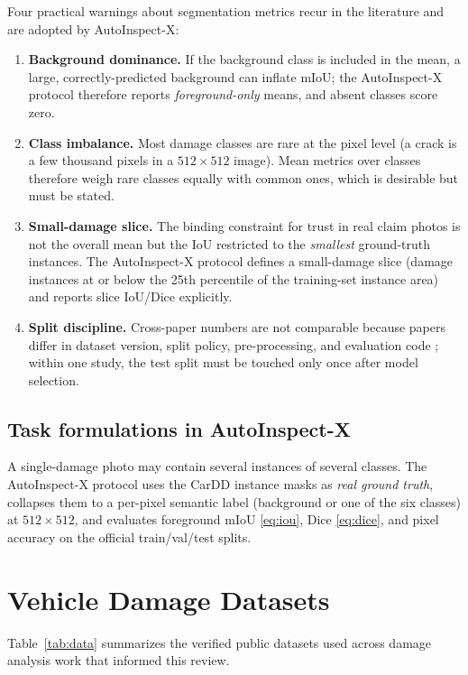 \documentclass[conference]{IEEEtran}
\begin{document}
Four practical warnings about segmentation metrics recur in the literature
\cite{voc2010,hasan2025} and are adopted by AutoInspect-X:
\begin{enumerate}
  \item \textbf{Background dominance.} If the background class is included in
  the mean, a large, correctly-predicted background can inflate mIoU; the
  AutoInspect-X protocol therefore reports \emph{foreground-only} means, and
  absent classes score zero.
  \item \textbf{Class imbalance.} Most damage classes are rare at the pixel
  level (a crack is a few thousand pixels in a $512\times512$ image). Mean
  metrics over classes therefore weigh rare classes equally with common ones,
  which is desirable but must be stated.
  \item \textbf{Small-damage slice.} The binding constraint for trust in real
  claim photos is not the overall mean but the IoU restricted to the
  \emph{smallest} ground-truth instances. The AutoInspect-X protocol defines a
  small-damage slice (damage instances at or below the 25th percentile of the
  training-set instance area) and reports slice IoU/Dice explicitly.
  \item \textbf{Split discipline.} Cross-paper numbers are not comparable because
  papers differ in dataset version, split policy, pre-processing, and evaluation
  code \cite{hasan2025}; within one study, the test split must be touched only
  once after model selection.
\end{enumerate}
\subsection{Task formulations in AutoInspect-X}
A single-damage photo may contain several instances of several classes. The
AutoInspect-X protocol uses the CarDD instance masks as \emph{real ground
truth}, collapses them to a per-pixel semantic label (background or one of the
six classes) at $512\times512$, and evaluates foreground mIoU \eqref{eq:iou}, Dice
\eqref{eq:dice}, and pixel accuracy on the official train/val/test splits.
\section{Vehicle Damage Datasets}
\label{sec:data}
Table~\ref{tab:data} summarizes the verified public datasets used across damage
analysis work that informed this review.
\end{document}
